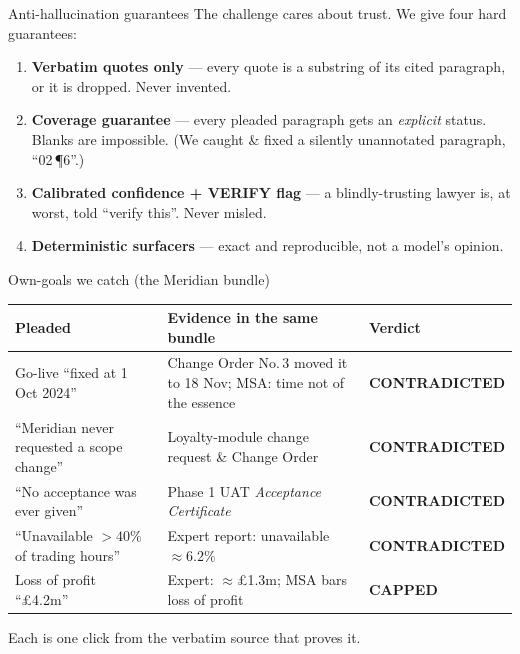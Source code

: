 \documentclass[aspectratio=169,10pt]{beamer}
\newcommand{\contradicted}{\textcolor{badred}{\textbf{CONTRADICTED}}}
\newcommand{\verify}{\textcolor{warnamber}{\textbf{VERIFY}}}
\begin{document}
\begin{frame}{Anti-hallucination guarantees}
  The challenge cares about trust. We give four hard guarantees:
  \begin{enumerate}
    \item \textbf{Verbatim quotes only} --- every quote is a substring of its
          cited paragraph, or it is \alert{dropped}. Never invented.
    \item \textbf{Coverage guarantee} --- every pleaded paragraph gets an
          \emph{explicit} status. Blanks are impossible.
          \footnotesize(We caught \& fixed a silently unannotated paragraph,
          ``02\,\P6''.)\normalsize
    \item \textbf{Calibrated confidence + \verify{} flag} --- a blindly-trusting
          lawyer is, at worst, told ``verify this''. Never misled.
    \item \textbf{Deterministic surfacers} --- exact and reproducible, not a
          model's opinion.
  \end{enumerate}
\end{frame}

\begin{frame}{Own-goals we catch (the Meridian bundle)}
  \footnotesize
  \begin{table}
    \begin{tabular}{@{}p{4.4cm} p{4.6cm} l@{}}
      \toprule
      \textbf{Pleaded} & \textbf{Evidence in the same bundle} & \textbf{Verdict}\\
      \midrule
      Go-live ``fixed at 1 Oct 2024'' &
        Change Order No.\,3 moved it to 18 Nov; MSA: time not of the essence &
        \contradicted{}\\[4pt]
      ``Meridian never requested a scope change'' &
        Loyalty-module change request \& Change Order &
        \contradicted{}\\[4pt]
      ``No acceptance was ever given'' &
        Phase 1 UAT \emph{Acceptance Certificate} &
        \contradicted{}\\[4pt]
      ``Unavailable $>40\%$ of trading hours'' &
        Expert report: unavailable $\approx 6.2\%$ &
        \contradicted{}\\[4pt]
      Loss of profit ``\pounds4.2m'' &
        Expert: $\approx$\pounds1.3m; MSA bars loss of profit &
        \textcolor{warnamber}{\textbf{CAPPED}}\\
      \bottomrule
    \end{tabular}
  \end{table}
  \normalsize
  \begin{center}
    Each is one click from the \alert{verbatim source} that proves it.
  \end{center}
\end{frame}
\end{document}
